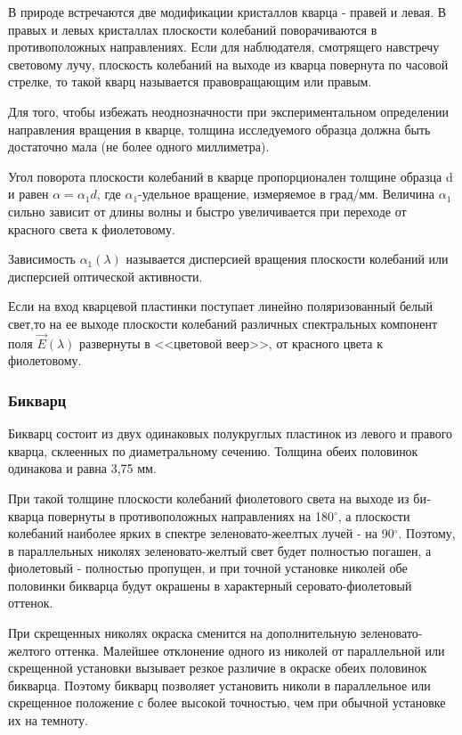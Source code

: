 В природе встречаются две модификации кристаллов кварца -
правей и левая. В правых и левых кристаллах плоскости колебаний
поворачиваются в противоположных направлениях. Если для наблюдателя, смотрящего навстречу световому лучу, плоскость колебаний
на выходе из кварца повернута по часовой стрелке, то такой кварц
называется правовращающим или правым. 

Для того, чтобы избежать
неоднозначности при экспериментальном определении направления
вращения в кварце, толщина исследуемого образца должна быть достаточно мала (не более одного миллиметра).

Угол поворота плоскости колебаний в кварце пропорционален
толщине образца d и равен $\alpha=\alpha_1d$, где $\alpha_1$-удельное вращение, измеряемое в град/мм. Величина $\alpha_1$ сильно зависит от длины волны и быстро увеличивается при переходе от красного света к фиолетовому. 

Зависимость $\alpha_1(\lambda)$ называет­ся дисперсией вращения плоскости колебаний или дисперсией оптической активности.

Если на вход кварцевой пластинки поступает линейно поляризованный белый свет,то на ее выходе плоскости колебаний различных спектральных компонент поля $\vec{E}(\lambda)$ развернуты в <<цветовой
веер>>, от красного цвета к фиолетовому.

\subsubsection*{Бикварц}

Бикварц состоит из двух одинаковых полукруглых пластинок
из левого и правого кварца, склеенных по диаметральному сечению.
Толщина обеих половинок одинакова и равна 3,75 мм. 

При такой
толщине плоскости колебаний фиолетового света на выходе из би­кварца повернуты в противоположных направлениях на 180$^\circ$, а плос­кости колебаний наиболее ярких в спектре зеленовато-жеелтых лучей - на 90$^\circ$. Поэтому, в параллельных николях зеленовато-желтый
свет будет полностью погашен, а фиолетовый - полностью пропущен,
и при точной установке николей обе половинки бикварца будут окрашены в характерный серовато-фиолетовый оттенок.

При скрещенных николях окраска сменится на дополнительную
зеленовато-желтого оттенка. Малейшее отклонение одного из николей от параллельной или скрещенной установки вызывает резкое раз­личие в окраске обеих половинок бикварца. Поэтому бикварц позво­ляет установить николи в параллельное или скрещенное положение с более высокой точностью, чем при обычной установке их на темноту.

